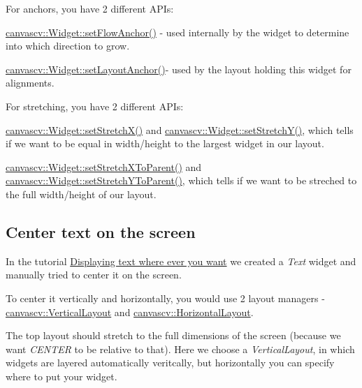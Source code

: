 For anchors, you have 2 different A\+P\+Is\+:
\begin{DoxyItemize}
\item \hyperlink{classcanvascv_1_1Widget_a69f455f7fbf67f636ee1155795057b87}{canvascv\+::\+Widget\+::set\+Flow\+Anchor()} -\/ used internally by the widget to determine into which direction to grow.
\item \hyperlink{classcanvascv_1_1Widget_a7180ca0054874c853e805e7842741596}{canvascv\+::\+Widget\+::set\+Layout\+Anchor()}-\/ used by the layout holding this widget for alignments.
\end{DoxyItemize}

For stretching, you have 2 different A\+P\+Is\+:
\begin{DoxyItemize}
\item \hyperlink{classcanvascv_1_1Widget_a7cdddebd755c499712793f727a057733}{canvascv\+::\+Widget\+::set\+Stretch\+X()} and \hyperlink{classcanvascv_1_1Widget_a3ef50b76d33c332cea4e632346b6df33}{canvascv\+::\+Widget\+::set\+Stretch\+Y()}, which tells if we want to be equal in width/height to the largest widget in our layout.
\item \hyperlink{classcanvascv_1_1Widget_a7b1ed6190950de22565c244f5aac49a4}{canvascv\+::\+Widget\+::set\+Stretch\+X\+To\+Parent()} and \hyperlink{classcanvascv_1_1Widget_a825028e2405bfdf9d92d372e60585703}{canvascv\+::\+Widget\+::set\+Stretch\+Y\+To\+Parent()}, which tells if we want to be streched to the full width/height of our layout.
\end{DoxyItemize}\hypertarget{tutlayouts_layouts_s1}{}\subsection{Center text on the screen}\label{tutlayouts_layouts_s1}
In the tutorial \hyperlink{tutscreentext_screentext_s2_3}{Displaying text where ever you want} we created a {\itshape Text} widget and manually tried to center it on the screen.

To center it vertically and horizontally, you would use 2 layout managers -\/ \hyperlink{classcanvascv_1_1VerticalLayout}{canvascv\+::\+Vertical\+Layout} and \hyperlink{classcanvascv_1_1HorizontalLayout}{canvascv\+::\+Horizontal\+Layout}.

The top layout should stretch to the full dimensions of the screen (because we want {\itshape C\+E\+N\+T\+ER} to be relative to that). Here we choose a {\itshape Vertical\+Layout}, in which widgets are layered automatically veritcally, but horizontally you can specify where to put your widget.

